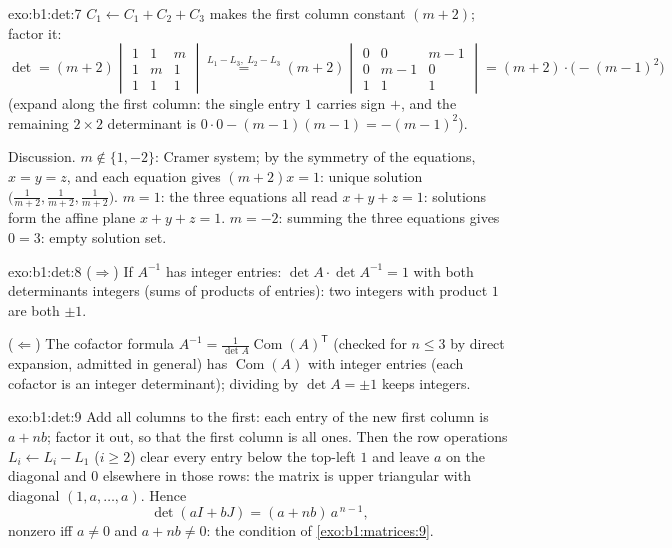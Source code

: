 \begin{solution}{exo:b1:det:7}
$C_1 \leftarrow C_1 + C_2 + C_3$ makes the first column constant
$(m+2)$; factor it:
\[
\det = (m+2)\begin{vmatrix}
1 & 1 & m\\ 1 & m & 1\\ 1 & 1 & 1
\end{vmatrix}
\overset{L_1 - L_3,\ L_2 - L_3}{=}
(m+2)\begin{vmatrix}
0 & 0 & m-1\\ 0 & m-1 & 0\\ 1 & 1 & 1
\end{vmatrix}
= (m+2)\cdot\bigl(-(m-1)^2\bigr)
\]
(expand along the first column: the single entry $1$ carries sign
$+$, and the remaining $2 \times 2$ determinant is $0 \cdot 0 -
(m-1)(m-1) = -(m-1)^2$).

Discussion. $m \notin \{1, -2\}$: Cramer system; by the symmetry of
the equations, $x = y = z$, and each equation gives $(m + 2)x = 1$:
unique solution $\bigl(\frac{1}{m+2}, \frac{1}{m+2},
\frac{1}{m+2}\bigr)$. $m = 1$: the three equations all read $x + y
+ z = 1$: solutions form the affine plane $x + y + z = 1$. $m = -2$:
summing the three equations gives $0 = 3$: empty solution set.
\end{solution}

\begin{solution}{exo:b1:det:8}
($\Rightarrow$) If $A^{-1}$ has integer entries: $\det A \cdot \det
A^{-1} = 1$ with both determinants integers (sums of products of
entries): two integers with product $1$ are both $\pm1$.

($\Leftarrow$) The cofactor formula $A^{-1} = \frac{1}{\det
A}\operatorname{Com}(A)^{\mathsf T}$ (checked for $n \leq 3$ by
direct expansion, admitted in general) has
$\operatorname{Com}(A)$ with integer entries (each cofactor is an
integer determinant); dividing by $\det A = \pm 1$ keeps integers.
\end{solution}

\begin{solution}{exo:b1:det:9}
Add all columns to the first: each entry of the new first column is
$a + nb$; factor it out, so that the first column is all ones. Then
the row operations $L_i \leftarrow L_i - L_1$ ($i \geq 2$) clear
every entry below the top-left $1$ and leave $a$ on the diagonal and
$0$ elsewhere in those rows: the matrix is upper triangular with
diagonal $(1, a, \dots, a)$. Hence
\[
\det(aI + bJ) = (a + nb)\, a^{\,n-1} ,
\]
nonzero iff $a \neq 0$ and $a + nb \neq 0$: the condition of
\cref{exo:b1:matrices:9}.
\end{solution}


